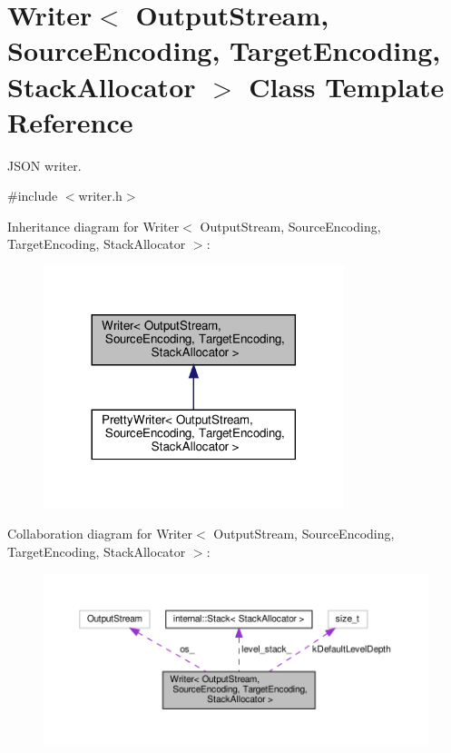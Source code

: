 \hypertarget{classWriter}{}\section{Writer$<$ Output\+Stream, Source\+Encoding, Target\+Encoding, Stack\+Allocator $>$ Class Template Reference}
\label{classWriter}


J\+S\+ON writer.  




{\ttfamily \#include $<$writer.\+h$>$}



Inheritance diagram for Writer$<$ Output\+Stream, Source\+Encoding, Target\+Encoding, Stack\+Allocator $>$\+:
\nopagebreak
\begin{figure}[H]
\begin{center}
\leavevmode
\includegraphics[width=248pt]{classWriter__inherit__graph}
\end{center}
\end{figure}


Collaboration diagram for Writer$<$ Output\+Stream, Source\+Encoding, Target\+Encoding, Stack\+Allocator $>$\+:
\nopagebreak
\begin{figure}[H]
\begin{center}
\leavevmode
\includegraphics[width=350pt]{classWriter__coll__graph}
\end{center}
\end{figure}
